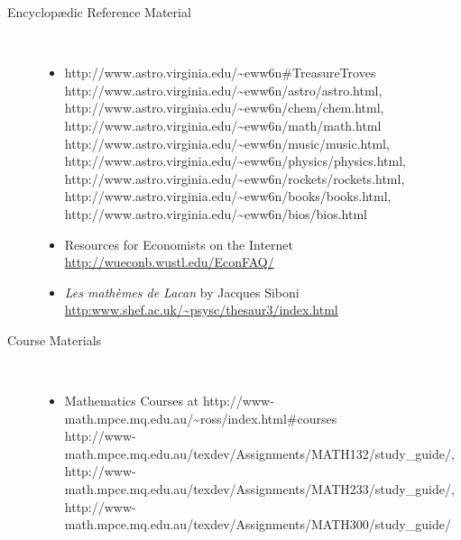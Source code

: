 \begin{description}
\begin{itemize}
%

\end{itemize}


\htmlrule[50\% center]

\item[Encyclop\ae{}dic Reference Material]~%
\begin{itemize}
\item
{}%
{http://www.astro.virginia.edu/\~{}eww6n\#TreasureTroves} 
%
{http://www.astro.virginia.edu/\~{}eww6n/astro/astro.html}, 
%
{http://www.astro.virginia.edu/\~{}eww6n/chem/chem.html}, 
%
{http://www.astro.virginia.edu/\~{}eww6n/math/math.html}\\ 
%
{http://www.astro.virginia.edu/\~{}eww6n/music/music.html}, 
%
{http://www.astro.virginia.edu/\~{}eww6n/physics/physics.html}, 
%
{http://www.astro.virginia.edu/\~{}eww6n/rockets/rockets.html}, 
%
{http://www.astro.virginia.edu/\~{}eww6n/books/books.html}, 
%
{http://www.astro.virginia.edu/\~{}eww6n/bios/bios.html}
\html{\smallskip}

\item
Resources for Economists on the Internet\\
\url{http://wueconb.wustl.edu/EconFAQ/}
\html{\smallskip}

\item
\textit{Les math\`emes de Lacan} by Jacques Siboni\\
\url{http:www.shef.ac.uk/~psysc/thesaur3/index.html}
\html{\smallskip}

\end{itemize}

\htmlrule[50\% center]


\item[Course Materials]~%
\begin{itemize}
\item
Mathematics Courses at %
{http://www-math.mpce.mq.edu.au/\~{}ross/index.html\#courses}\\
%
{http://www-math.mpce.mq.edu.au/texdev/Assignments/MATH132/study_guide/}, 
%
{http://www-math.mpce.mq.edu.au/texdev/Assignments/MATH233/study_guide/}, 
%
{http://www-math.mpce.mq.edu.au/texdev/Assignments/MATH300/study_guide/}
\html{\smallskip}


\end{itemize}
\end{description}
